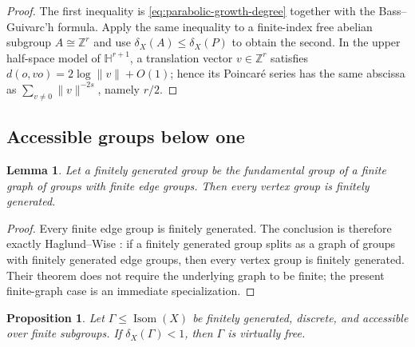 \documentclass[11pt]{article}
\newtheorem{proposition}[proposition]{Proposition}
\newtheorem{lemma}[lemma]{Lemma}
\theoremstyle{definition}
\newcommand{\Isom}{\operatorname{Isom}}
\begin{document}
\begin{proof}
The first inequality is \eqref{eq:parabolic-growth-degree} together with the
Bass--Guivarc'h formula.  Apply the same inequality to a finite-index free abelian subgroup
$A\cong\mathbb Z^r$ and use $\delta_X(A)\le\delta_X(P)$ to obtain the second.  In the upper
half-space model of $\mathbb H^{r+1}$, a translation vector $v\in\mathbb Z^r$ satisfies
$d(o,vo)=2\log\|v\|+O(1)$; hence its Poincar\'e series has the same abscissa as
$\sum_{v\ne0}\|v\|^{-2s}$, namely $r/2$.
\end{proof}


\subsection{Accessible groups below one}

\begin{lemma}
\label{lem:accessible-vertex-fg}
Let a finitely generated group be the fundamental group of a finite graph of groups with finite
edge groups.  Then every vertex group is finitely generated.
\end{lemma}

\begin{proof}
Every finite edge group is finitely generated.  The conclusion is therefore exactly
Haglund--Wise \cite[Theorem~1.3]{HaglundWise2021}: if a finitely generated group splits as a
graph of groups with finitely generated edge groups, then every vertex group is finitely
generated.  Their theorem does not require the underlying graph to be finite; the present
finite-graph case is an immediate specialization.
\end{proof}

\begin{proposition}
\label{prop:accessible-virtually-free}
Let $\Gamma\le\Isom(X)$ be finitely generated, discrete, and accessible over finite subgroups.
If $\delta_X(\Gamma)<1$, then $\Gamma$ is virtually free.
\end{proposition}
\end{document}
